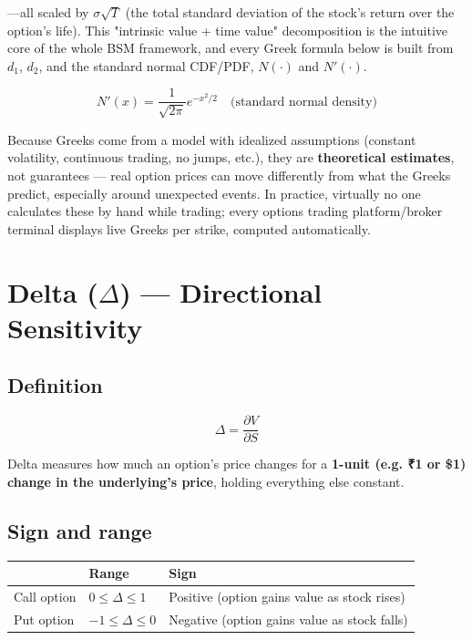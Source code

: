 \documentclass[12pt,openany]{book}
\theoremstyle{definition}
\theoremstyle{remark}
\begin{document}
—all scaled by \(\sigma\sqrt{T}\) (the total standard deviation of the stock's return over the option's life). This "intrinsic value + time value" decomposition is the intuitive core of the whole BSM framework, and every Greek formula below is built from \(d_1\), \(d_2\), and the standard normal CDF/PDF, \(N(\cdot)\) and \(N'(\cdot)\).

\[
N'(x) = \frac{1}{\sqrt{2\pi}}e^{-x^2/2} \quad \text{(standard normal density)}
\]

Because Greeks come from a model with idealized assumptions (constant volatility, continuous trading, no jumps, etc.), they are \textbf{theoretical estimates}, not guarantees — real option prices can move differently from what the Greeks predict, especially around unexpected events. In practice, virtually no one calculates these by hand while trading; every options trading platform/broker terminal displays live Greeks per strike, computed automatically.


\section{Delta (\texorpdfstring{\(\Delta\)}{Delta}) — Directional Sensitivity}

\subsection{Definition}

\[
\Delta = \frac{\partial V}{\partial S}
\]

Delta measures how much an option's price changes for a \textbf{1-unit (e.g. ₹1 or \$1) change in the underlying's price}, holding everything else constant.

\subsection{Sign and range}

{\small
\begin{longtable}{@{}L{0.18\textwidth}L{0.34\textwidth}L{0.38\textwidth}@{}}
\toprule
\textbf{} & \textbf{Range} & \textbf{Sign} \\
\midrule
Call option & \(0 \le \Delta \le 1\) & Positive (option gains value as stock rises) \\
Put option & \(-1 \le \Delta \le 0\) & Negative (option gains value as stock falls) \\
\bottomrule
\end{longtable}
}
\end{document}
